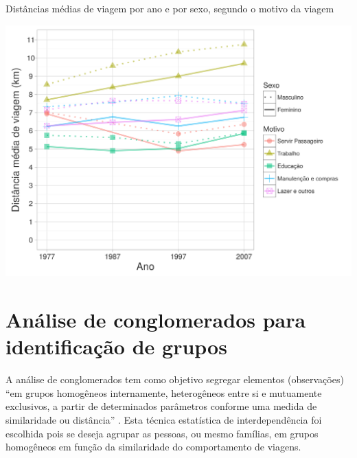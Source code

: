 \begin{grafico}[htb]%
    \caption{\label{graf:distancia-motivo}Distâncias médias de viagem por ano e por sexo, segundo o motivo da viagem}%
    \begin{center}%
        \includegraphics[width=1\textwidth]{./imagens/distancia-motivo.png}%
    \end{center}%
\end{grafico}%




\clearpage
\clearpage
\section{Análise de conglomerados para identificação de grupos}\label{sec:analises-clusters}

A análise de conglomerados tem como objetivo segregar elementos (observações) ``em grupos homogêneos internamente, heterogêneos entre si e mutuamente exclusivos, a partir de determinados parâmetros conforme uma medida de similaridade ou distância'' \cite[p.196]{FAVERO2009}.  
Esta técnica estatística de interdependência foi escolhida pois se deseja agrupar as pessoas, ou mesmo famílias, em grupos homogêneos em função da similaridade do comportamento de viagens.

